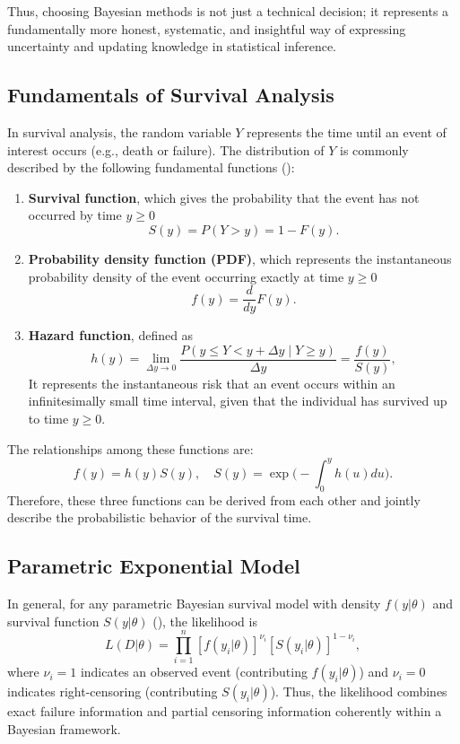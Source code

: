 Thus, choosing Bayesian methods is not just a technical decision; it represents a fundamentally more honest, systematic, and insightful way of expressing uncertainty and updating knowledge in statistical inference.






\subsection{Fundamentals of Survival Analysis} \label{Fundamentals of Survival Analysis}

In survival analysis, the random variable $Y$ represents the time until an event of interest occurs (e.g., death or failure). The distribution of $Y$ is commonly described by the following fundamental functions (\cite{kleinbaum1996survival}):
\begin{enumerate}
    \item \textbf{Survival function}, which gives the probability that the event has not occurred by time $y \ge 0$
   $$
   S(y) = P(Y > y) = 1 - F(y).
   $$
   \item \textbf{Probability density function (PDF)}, which represents the instantaneous probability density of the event occurring exactly at time $y \ge 0$
   $$
   f(y) = \frac{d}{dy} F(y).
   $$
   \item \textbf{Hazard function}, defined as
   $$
   h(y) = \lim_{\Delta y \to 0} 
   \frac{P(y \le Y < y + \Delta y \mid Y \ge y)}{\Delta y}
   = \frac{f(y)}{S(y)},
   $$
   It represents the instantaneous risk that an event occurs within an infinitesimally small time interval, given that the individual has survived up to time \( y \ge 0\).
\end{enumerate}

The relationships among these functions are:
$$
f(y) = h(y) S(y),
\quad
S(y) = \exp\Big( - \int_0^y h(u) du \Big).
$$
Therefore, these three functions can be derived from each other and jointly describe the probabilistic behavior of the survival time.




\subsection{Parametric Exponential Model} \label{Exponential Model}

In general, for any parametric Bayesian survival model with density $f(y|\theta)$ and survival function $S(y|\theta)$ (\cite{ibrahim2013bayesian}), the likelihood is
$$
L( D | \theta)
= \prod_{i=1}^n
[ f(y_i | \theta) ]^{\nu_i}
[ S(y_i | \theta) ]^{1 - \nu_i},
$$
where $\nu_i=1$ indicates an observed event (contributing $f(y_i|\theta)$) and $\nu_i=0$ indicates right-censoring (contributing $S(y_i|\theta)$). Thus, the likelihood combines exact failure information and partial censoring information coherently within a Bayesian framework.


